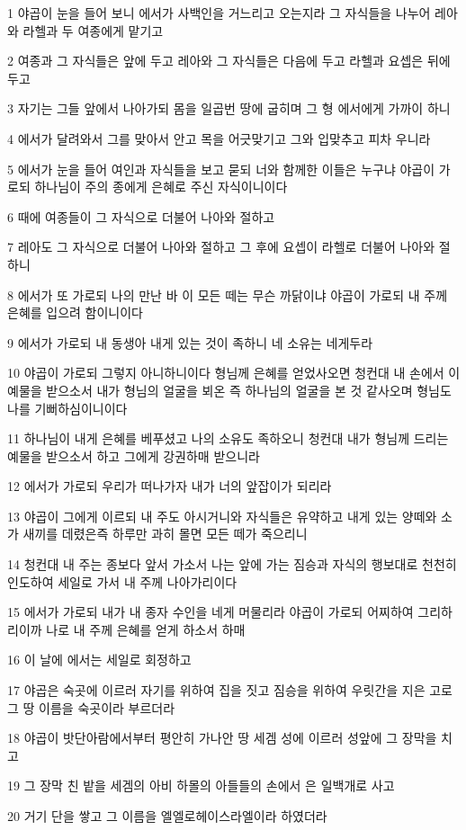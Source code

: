 \par 1 야곱이 눈을 들어 보니 에서가 사백인을 거느리고 오는지라 그 자식들을 나누어 레아와 라헬과 두 여종에게 맡기고
\par 2 여종과 그 자식들은 앞에 두고 레아와 그 자식들은 다음에 두고 라헬과 요셉은 뒤에 두고
\par 3 자기는 그들 앞에서 나아가되 몸을 일곱번 땅에 굽히며 그 형 에서에게 가까이 하니
\par 4 에서가 달려와서 그를 맞아서 안고 목을 어긋맞기고 그와 입맞추고 피차 우니라
\par 5 에서가 눈을 들어 여인과 자식들을 보고 묻되 너와 함께한 이들은 누구냐 야곱이 가로되 하나님이 주의 종에게 은혜로 주신 자식이니이다
\par 6 때에 여종들이 그 자식으로 더불어 나아와 절하고
\par 7 레아도 그 자식으로 더불어 나아와 절하고 그 후에 요셉이 라헬로 더불어 나아와 절하니
\par 8 에서가 또 가로되 나의 만난 바 이 모든 떼는 무슨 까닭이냐 야곱이 가로되 내 주께 은혜를 입으려 함이니이다
\par 9 에서가 가로되 내 동생아 내게 있는 것이 족하니 네 소유는 네게두라
\par 10 야곱이 가로되 그렇지 아니하니이다 형님께 은혜를 얻었사오면 청컨대 내 손에서 이 예물을 받으소서 내가 형님의 얼굴을 뵈온 즉 하나님의 얼굴을 본 것 같사오며 형님도 나를 기뻐하심이니이다
\par 11 하나님이 내게 은혜를 베푸셨고 나의 소유도 족하오니 청컨대 내가 형님께 드리는 예물을 받으소서 하고 그에게 강권하매 받으니라
\par 12 에서가 가로되 우리가 떠나가자 내가 너의 앞잡이가 되리라
\par 13 야곱이 그에게 이르되 내 주도 아시거니와 자식들은 유약하고 내게 있는 양떼와 소가 새끼를 데렸은즉 하루만 과히 몰면 모든 떼가 죽으리니
\par 14 청컨대 내 주는 종보다 앞서 가소서 나는 앞에 가는 짐승과 자식의 행보대로 천천히 인도하여 세일로 가서 내 주께 나아가리이다
\par 15 에서가 가로되 내가 내 종자 수인을 네게 머물리라 야곱이 가로되 어찌하여 그리하리이까 나로 내 주께 은혜를 얻게 하소서 하매
\par 16 이 날에 에서는 세일로 회정하고
\par 17 야곱은 숙곳에 이르러 자기를 위하여 집을 짓고 짐승을 위하여 우릿간을 지은 고로 그 땅 이름을 숙곳이라 부르더라
\par 18 야곱이 밧단아람에서부터 평안히 가나안 땅 세겜 성에 이르러 성앞에 그 장막을 치고
\par 19 그 장막 친 밭을 세겜의 아비 하몰의 아들들의 손에서 은 일백개로 사고
\par 20 거기 단을 쌓고 그 이름을 엘엘로헤이스라엘이라 하였더라

